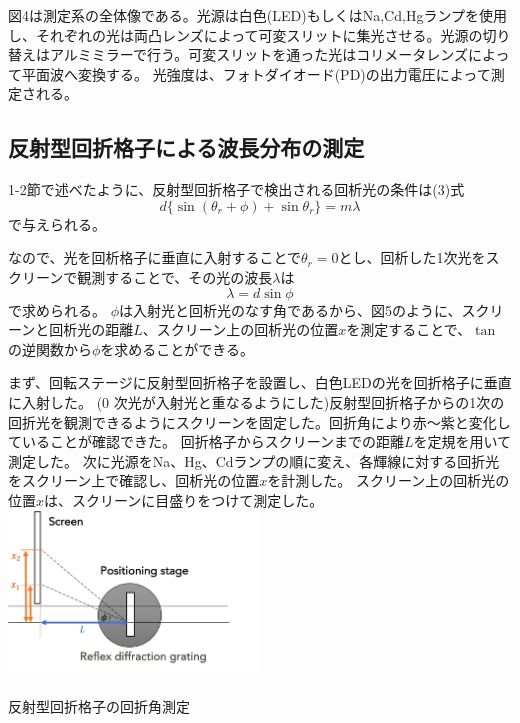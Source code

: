\documentclass[a4paper,10pt]{jsarticle}
\makeatletter
\newenvironment{figurehere}
{\def\@captype{figure}}
{}
\makeatother
\begin{document}
図4は測定系の全体像である。光源は白色(LED)もしくはNa,Cd,Hgランプを使用し、それぞれの光は両凸レンズによって可変スリットに集光させる。光源の切り替えはアルミミラーで行う。可変スリットを通った光はコリメータレンズによって平面波へ変換する。
光強度は、フォトダイオード(PD)の出力電圧によって測定される。

\begin{multicols}{2}
  
\subsection{反射型回折格子による波長分布の測定}
1-2節で述べたように、反射型回折格子で検出される回析光の条件は(3)式
$$d\{\sin(\theta_r+\phi)+\sin\theta_r\} = m\lambda$$
で与えられる。


なので、光を回析格子に垂直に入射することで$\theta_r = 0$とし、回析した1次光をスクリーンで観測することで、その光の波長$\lambda$は
\begin{equation}
  \lambda = d\sin\phi
\end{equation}
で求められる。
$\phi$は入射光と回析光のなす角であるから、図5のように、スクリーンと回析光の距離$L$、スクリーン上の回析光の位置$x$を測定することで、$\tan$の逆関数から$\phi$を求めることができる。


まず、回転ステージに反射型回折格子を設置し、白色LEDの光を回折格子に垂直に入射した。
(0 次光が入射光と重なるようにした)反射型回折格子からの1次の回折光を観測できるようにスクリーンを固定した。回折角により赤〜紫と変化していることが確認できた。
回折格子からスクリーンまでの距離$L$を定規を用いて測定した。
次に光源をNa、Hg、Cdランプの順に変え、各輝線に対する回折光をスクリーン上で確認し、回析光の位置$x
$を計測した。
スクリーン上の回析光の位置$x$は、スクリーンに目盛りをつけて測定した。
\\

\begin{figurehere}
  \centering
  \includegraphics[width=0.5\textwidth]{figs/sample1.pdf}
  \caption{反射型回折格子の回折角測定}
  \label{fig:fig1}
\end{figurehere}


\end{multicols}
\end{document}
